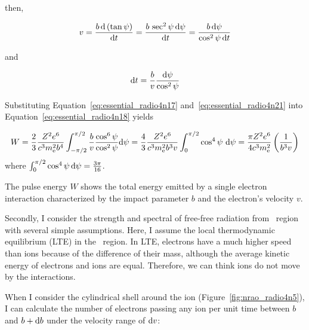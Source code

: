 then,

\begin{equation}\label{eq:essential_radio4n20}
    v=\frac{b\,\mathrm{d}\left(\tan \psi\right)}{\mathrm{d} t}=\frac{b\,\sec ^{2} \psi\,\mathrm{d} \psi}{\mathrm{d} t}=\frac{b\,\mathrm{d} \psi}{\cos ^{2}\psi\,\mathrm{d} t}
\end{equation}

and

\begin{equation}\label{eq:essential_radio4n21}
    \mathrm{d} t=\frac{b}{v} \frac{\mathrm{d} \psi}{\cos ^{2} \psi}
\end{equation}

Substituting Equation~\ref{eq:essential_radio4n17} and~\ref{eq:essential_radio4n21} into Equation~\ref{eq:essential_radio4n18} yields

\begin{equation}\label{eq:essential_radio4n22}
    W=\frac{2}{3} \frac{Z^{2} e^{6}}{c^{3} m_{\mathrm{e}}^{2} b^{4}} \int_{-\pi / 2}^{\pi / 2} \frac{b}{v} \frac{\cos ^{6} \psi}{\cos ^{2} \psi} \mathrm{d} \psi=\frac{4}{3} \frac{Z^{2} e^{6}}{c^{3} m_{\mathrm{e}}^{2} b^{3} v} \int_{0}^{\pi / 2} \cos ^{4} \psi\ \mathrm{d} \psi = \frac{\pi Z^2 e^6}{4 c^3 m_{\mathrm{e}}^2}\left(\frac{1}{b^3v}\right)
\end{equation}
where $\int_{0}^{\pi / 2} \cos ^{4} \psi\,\mathrm{d} \psi=\frac{3 \pi}{16}$.

The pulse energy $W$ shows the total energy emitted by a single electron interaction characterized by the impact parameter $b$ and the electron's velocity $v$.\\ \vspace{0.2cm}

Secondly, I consider the strength and spectral of free-free radiation from \ih~region with several simple assumptions.
Here, I assume the local thermodynamic equilibrium (LTE) in the \ih~region.
In LTE, electrons have a much higher speed than ions because of the difference of their mass, although the average kinetic energy of electrons and ions are equal.
Therefore, we can think ions do not move by the interactions.

When I consider the cylindrical shell around the ion (Figure~\ref{fig:nrao_radio4n5}), I can calculate the number of electrons passing any ion per unit time between $b$ and $b + \mathrm{d} b$ under the velocity range of $\mathrm{d} v$:

